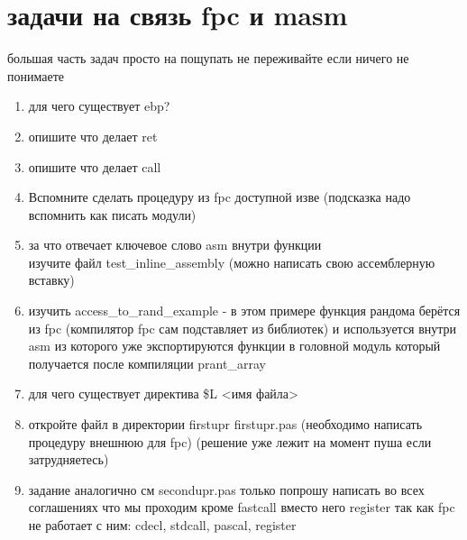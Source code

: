 \documentclass[a4paper,10pt]{article}
\begin{document}
\section*{задачи на связь fpc и masm}
большая часть задач просто на пощупать не переживайте если ничего не понимаете
\begin{enumerate}
    \item для чего существует ebp?
    \item опишите что делает ret
    \item опишите что делает call
    \item Вспомните сделать процедуру из fpc доступной изве (подсказка надо вспомнить как писать модули)
    \item за что отвечает ключевое слово asm внутри функции \\
    изучите  файл test\_inline\_assembly (можно написать свою ассемблерную вставку)
    \item изучить access\_to\_rand\_example - в этом примере функция рандома берётся из fpc (компилятор fpc сам подставляет из библиотек) и используется внутри asm из которого уже экспортируются функции в головной модуль который получается после компиляции prant\_array 
    \item для чего существует директива {\$L <имя файла>}
    \item откройте файл в директории firstupr firstupr.pas (необходимо написать процедуру внешнюю для fpc) (решение уже лежит на момент пуша если затрудняетесь)
    \item задание аналогично см secondupr.pas только попрошу написать во всех соглашениях что мы проходим кроме fastcall вместо него register так как fpc не работает с ним: cdecl, stdcall, pascal, register
\end{enumerate}
\end{document}
